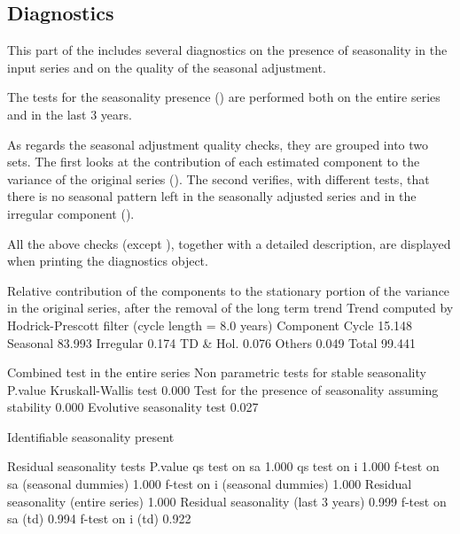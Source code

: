 \documentclass[article]{jss}
\begin{document}
\hypertarget{diagnostics}{%
\subsection{Diagnostics}\label{diagnostics}}

This part of the  includes several diagnostics on the
presence of seasonality in the input series and on the quality of the
seasonal adjustment.

The tests for the seasonality presence () are
performed both on the entire series and in the last 3 years.

As regards the seasonal adjustment quality checks, they are grouped into
two sets. The first looks at the contribution of each estimated
component to the variance of the original series
(). The second verifies, with different
tests, that there is no seasonal pattern left in the seasonally adjusted
series and in the irregular component ().

All the above checks (except ), together
with a detailed description, are displayed when printing the diagnostics
object.

\begin{CodeChunk}


\begin{CodeOutput}
 Relative contribution of the components to the stationary
 portion of the variance in the original series,
 after the removal of the long term trend 
 Trend computed by Hodrick-Prescott filter (cycle length = 8.0 years)
           Component
 Cycle        15.148
 Seasonal     83.993
 Irregular     0.174
 TD & Hol.     0.076
 Others        0.049
 Total        99.441

 Combined test in the entire series 
 Non parametric tests for stable seasonality
                                                          P.value
   Kruskall-Wallis test                                      0.000
   Test for the presence of seasonality assuming stability   0.000
   Evolutive seasonality test                                0.027
 
 Identifiable seasonality present

 Residual seasonality tests 
                                      P.value
 qs test on sa                          1.000
 qs test on i                           1.000
 f-test on sa (seasonal dummies)        1.000
 f-test on i (seasonal dummies)         1.000
 Residual seasonality (entire series)   1.000
 Residual seasonality (last 3 years)    0.999
 f-test on sa (td)                      0.994
 f-test on i (td)                       0.922
\end{CodeOutput}
\end{CodeChunk}
\end{document}
